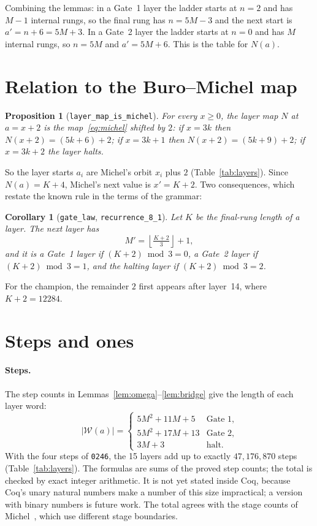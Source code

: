 \documentclass[11pt]{article}
\newtheorem{proposition}[theorem]{Proposition}
\newtheorem{corollary}[theorem]{Corollary}
\theoremstyle{definition}
\theoremstyle{remark}
\newcommand{\coq}[1]{\texttt{#1}}
\newcommand{\W}{\mathcal{W}}
\begin{document}
Combining the lemmas: in a Gate~1 layer the ladder starts at $n=2$ and has $M-1$
internal rungs, so the final rung has $n = 5M-3$ and the next start is
$a' = n+6 = 5M+3$. In a Gate~2 layer the ladder starts at $n=0$ and has $M$ internal
rungs, so $n = 5M$ and $a' = 5M+6$. This is the table for $N(a)$.

\section{Relation to the Buro--Michel map}

\begin{proposition}[\coq{layer\_map\_is\_michel}]\label{prop:michel}
For every $x\ge0$, the layer map $N$ at $a=x+2$ is the map~\eqref{eq:michel} shifted
by $2$: if $x=3k$ then $N(x+2) = (5k+6)+2$; if $x=3k+1$ then $N(x+2) = (5k+9)+2$; if
$x=3k+2$ the layer halts.
\end{proposition}

So the layer starts $a_i$ are Michel's orbit $x_i$ plus $2$ (Table~\ref{tab:layers}).
Since $N(a)=K+4$, Michel's next value is $x' = K+2$. Two consequences, which restate
the known rule in the terms of the grammar:
\begin{corollary}[\coq{gate\_law}, \coq{recurrence\_8\_1}]\label{cor:gate}
Let $K$ be the final-rung length of a layer. The next layer has
\[
M' = \left\lfloor \tfrac{K+2}{3} \right\rfloor + 1,
\]
and it is a Gate~1 layer if $(K+2)\bmod 3 = 0$, a Gate~2 layer if $(K+2)\bmod 3 = 1$,
and the halting layer if $(K+2)\bmod 3 = 2$.
\end{corollary}
For the champion, the remainder $2$ first appears after layer~14, where $K+2=12284$.

\section{Steps and ones}\label{sec:counts}

\paragraph{Steps.} The step counts in Lemmas~\ref{lem:omega}--\ref{lem:bridge} give the
length of each layer word:
\[
|\W(a)| =
\begin{cases}
5M^2 + 11M + 5 & \text{Gate 1},\\
5M^2 + 17M + 13 & \text{Gate 2},\\
3M + 3 & \text{halt}.
\end{cases}
\]
With the four steps of \texttt{0246}, the 15 layers add up to exactly $47{,}176{,}870$
steps (Table~\ref{tab:layers}). The formulas are sums of the proved step counts; the
total is checked by exact integer arithmetic. It is not yet stated inside Coq, because
Coq's unary natural numbers make a number of this size impractical; a version with
binary numbers is future work. The total agrees with the stage counts of
Michel~\cite{michelbeh}, which use different stage boundaries.
\end{document}
